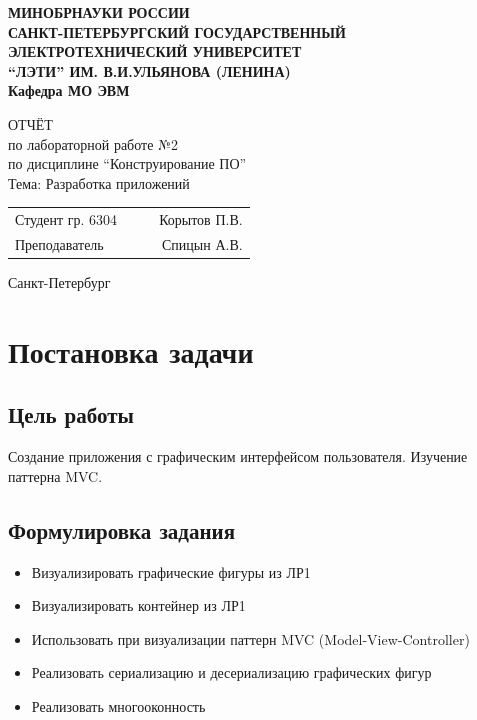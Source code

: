\documentclass[a4paper, 14pt]{extarticle}
\begin{document}
\begin{titlepage}
    \centering
    {\bfseries
        \uppercase{
            Минобрнауки России \\
            Санкт-Петербургский государственный \\
            Электротехнический университет \\
            \enquote{ЛЭТИ} им. В.И.Ульянова (Ленина)\\
        }
        Кафедра МО ЭВМ

        \vspace{\fill}
        \uppercase{Отчёт} \\
        по лабораторной работе №2 \\
        по дисциплине \enquote{Конструирование ПО} \\
        Тема: Разработка приложений
    }

    \vspace{\fill}
    \begin{tabularx}{0.8\textwidth}{l X c r}
        Студент гр. 6304 & & \underline{\hspace{3cm}} & Корытов П.В.\\
        Преподаватель & & \underline{\hspace{3cm}} & Спицын А.В.
    \end{tabularx}

    \vspace{1cm}
    Санкт-Петербург \\
    \the\year{}
\end{titlepage}

\tableofcontents{}
\newpage

\section{Постановка задачи}
\subsection{Цель работы}
Создание приложения с графическим интерфейсом пользователя. Изучение паттерна MVC.\@

\subsection{Формулировка задания}
\begin{itemize}
    \item Визуализировать графические фигуры из ЛР1
    \item Визуализировать контейнер из ЛР1
    \item Использовать при визуализации паттерн MVC (Model-View-Controller)
    \item Реализовать сериализацию и десериализацию графических фигур
    \item Реализовать многооконность
\end{itemize}
\end{document}
